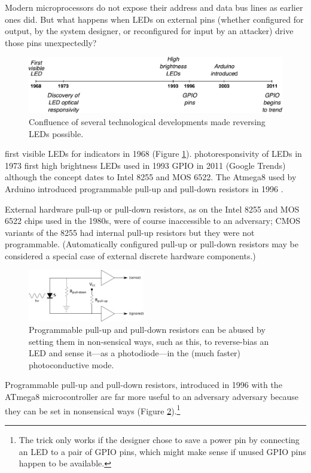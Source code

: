 \documentclass[a4paper,twoside,11pt]{book}
\begin{document}
Modern microprocessors do not expose their address and data bus lines as
earlier ones did. But what happens when LEDs on external pins (whether
configured for output, by the system designer, or reconfigured for input by an
attacker) drive those pins unexpectedly?
\begin{figure}[ht]
  \centering
  \includegraphics[width=\textwidth]{timeline.pdf}
  \caption{Confluence of several technological developments made reversing LEDs
    possible.}
  \label{figure:timeline}
\end{figure}
first visible LEDs for indicators in 1968 (Figure \ref{figure:timeline}).
photoresponsivity of LEDs in 1973
first high brightness LEDs used in 1993
GPIO in 2011 (Google Trends) although the concept dates to Intel 8255 and MOS
6522. The Atmega8 used by Arduino introduced programmable pull-up and pull-down
resistors in 1996 \cite{Mims1973b,Atmel2013,Stringfellow1997}.

External hardware pull-up or pull-down resistors, as on the Intel 8255 and MOS
6522 chips used in the 1980s, were of course inaccessible to an adversary; CMOS
variants of the 8255 had internal pull-up resistors but they were not
programmable. (Automatically configured pull-up or pull-down resistors may be
considered a special case of external discrete hardware components.)
\begin{figure}[ht]
  \centering
  \includegraphics[width=2in]{nonsensical.pdf}
  \caption{Programmable pull-up and pull-down resistors can be abused by
    setting them in non-sensical ways, such as this, to reverse-bias an LED
    and sense it---as a photodiode---in the (much faster) photoconductive
    mode.}
  \label{figure:nonsensical}
\end{figure}
Programmable pull-up and pull-down resistors, introduced in 1996 with the
ATmega8 microcontroller \cite{Atmel2013} are far more useful to an adversary
adversary because they can be set in nonsensical ways (Figure
\ref{figure:nonsensical}).\footnote{The trick only works if the designer chose
to save a power pin by connecting an LED to a pair of GPIO pins, which might
make sense if unused GPIO pins happen to be available.}
\end{document}
